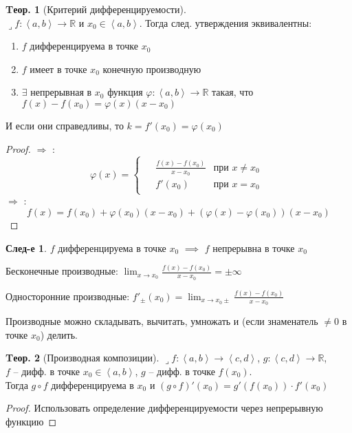 \documentclass[a4paper,12pt]{article}
\numberwithin{figure}{section}
\theoremstyle{definition}
\theoremstyle{definition}
\newtheorem{theorem}{Tеор.}[section]
\newtheorem*{corollary}{След-е} %
\def\DS{\displaystyle}
\def\RR{\mathbb{R}}
\def\on{\!:}
\def\intab{\left<a,b\right>}
\def\circleone{\ding{192}\space}
\def\circletwo{\ding{193}\space}
\def\circlethree{\ding{194}\space}
\def\lets{{\huge$\lrcorner$}\space}
\begin{document}
\begin{theorem}[Критерий дифференцируемости] \ \\
	\lets $f\on \intab\to\RR$ и $x_0\in\intab$.
	Тогда след. утверждения эквивалентны:
	\begin{enumerate}
		\item $f$ дифференцируема в точке $x_0$
		\item $f$ имеет в точке $x_0$ конечную производную
		\item $\exists$ непрерывная в $x_0$ функция $\varphi\on\intab\to\RR$
			  такая, что $f(x)-f(x_0) = \varphi(x)(x-x_0)$
	\end{enumerate}
	И если они справедливы, то $k=f'(x_0)=\varphi(x_0)$
\end{theorem}
\begin{proof}
	\circletwo $\Rightarrow$ \circlethree: \[
		\varphi(x) = \begin{cases}\begin{aligned}
			& \frac{f(x)-f(x_0)}{x-x_0}  & \text{при } x \ne x_0 \\
			& f'(x_0)                    & \text{при } x=x_0
		\end{aligned}
		\end{cases}
	\]
	\circlethree $\Rightarrow$ \circleone: \[
		f(x) = f(x_0) + \varphi(x_0)(x-x_0) + \left( \varphi(x)-\varphi(x_0) \right) (x-x_0)
	\]
\end{proof}

\begin{corollary}
	$f$ дифференцируема в точке $x_0$ $\implies$ $f$ непрерывна в точке $x_0$
\end{corollary}

\bigskip\medskip


Бесконечные производные:
$\DS \lim_{x\to x_0}\frac{f(x)-f(x_0)}{x-x_0} = \pm\infty$

Односторонние производные:
$\DS f'_{\pm}(x_0) = \lim_{x\to x_0\pm}\frac{f(x)-f(x_0)}{x-x_0}$

Производные можно складывать, вычитать, умножать
и (если знаменатель $\ne0$ в точке $x_0$) делить.
\bigskip


\begin{theorem}[Производная композиции]
	\def\intcd{\left<c,d\right>}
	\lets $f\on \intab \to \intcd$,	\medspace $g\on \intcd \to \RR$,
	\\ $f$ -- дифф. в точке $x_0 \in\intab$, \medspace $g$ -- дифф. в точке $f(x_0)$.
	\\ Тогда $g \circ f$ дифференцируема в $x_0$
	и $(g \circ f)'(x_0) = g'(f(x_0)) \cdot f'(x_0)$
\end{theorem}
\begin{proof}
	Использовать определение дифференцируемости
	\circlethree через непрерывную функцию
\end{proof}
\medskip
\end{document}
